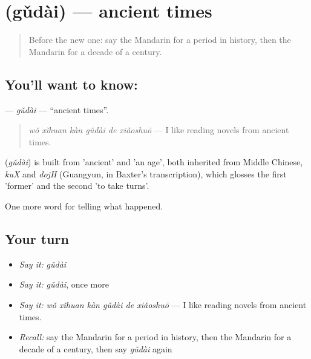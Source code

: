\section[\texorpdfstring{\zh{古代} (gǔdài)}{古代 (gǔdài)}]{ (gǔdài) — ancient times}

\label{lesson:ZH-C323-gudai}



\begin{quote}
Before the new one: say the Mandarin for a period in history, then the Mandarin for a decade of a century.
\end{quote}

\subsection*{You'll want to know: }
\textbf{} — \emph{gǔdài} — \textquotedblleft{}ancient times\textquotedblright{}.

\begin{quote}
\textbf{} \emph{wǒ xǐhuan kàn gǔdài de xiǎoshuō} — I like reading novels from ancient times.
\end{quote}

\begin{cousinweb}
\textbf{} (\emph{gǔdài}) is built from  'ancient' and  'an age', both inherited from Middle Chinese, \emph{kuX} and \emph{dojH} (Guangyun, in Baxter's transcription), which glosses the first 'former' and the second 'to take turns'.
\end{cousinweb}

\begin{grammarlens}[title={What you've built}]
One more word for telling what happened.
\end{grammarlens}

\subsection*{Your turn}
\begin{itemize}
\raggedright
  \item \emph{Say it:} \emph{gǔdài}
  \item \emph{Say it:} \emph{gǔdài}, once more
  \item \emph{Say it:} \emph{wǒ xǐhuan kàn gǔdài de xiǎoshuō} — I like reading novels from ancient times.
  \item \emph{Recall:} say the Mandarin for a period in history, then the Mandarin for a decade of a century, then say \emph{gǔdài} again
\end{itemize}


